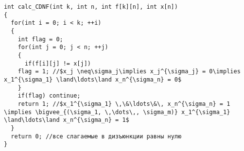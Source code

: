 \documentclass[a5paper]{article}
\begin{document}

\begin{lstlisting}[mathescape]
int calc_CDNF(int k, int n, int f[k][n], int x[n])
{
  for(int i = 0; i < k; ++i)
  {
    int flag = 0;
    for(int j = 0; j < n; ++j)
    {
      if(f[i][j] != x[j])
	flag = 1; //$x_j \neq\sigma_j\implies x_j^{\sigma_j} = 0\implies x_1^{\sigma_1} \land\ldots\land x_n^{\sigma_n} = 0$
    }
    if(flag) continue;
    return 1; //$x_1^{\sigma_1} \,\&\ldots\&\, x_n^{\sigma_n} = 1 \implies \bigvee_{(\sigma_1, \,\dots\,, \sigma_m)} x_1^{\sigma_1} \land\ldots\land x_n^{\sigma_n} = 1$
  }
  return 0; //все слагаемые в дизъюнкции равны нулю
}
\end{lstlisting}
\end{document}
